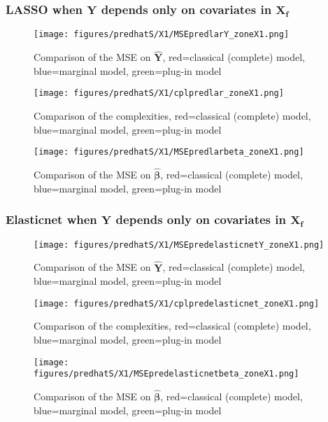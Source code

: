 \documentclass[12pt,a4paper]{report}
\begin{document}
\subsubsection{LASSO when $\boldsymbol{Y}$ depends only on covariates in $\boldsymbol{X_f}$}

	\begin{figure}[h!]
	\centering
		  \texttt{[image: figures/predhatS/X1/MSEpredlarY\_zoneX1.png]}
		\caption{Comparison of the MSE on $\hat{\boldsymbol{Y}}$, red=classical (complete) model, blue=marginal model, green=plug-in model}\label{MSEpredlarY_zoneX1}
	\end{figure}
	\begin{figure}[h!]
	\centering
		  \texttt{[image: figures/predhatS/X1/cplpredlar\_zoneX1.png]}
		\caption{Comparison of the complexities, red=classical (complete) model, blue=marginal model, green=plug-in model}\label{cplpredlar_zoneX1}
	\end{figure}
	\begin{figure}[h!]
	\centering
		  \texttt{[image: figures/predhatS/X1/MSEpredlarbeta\_zoneX1.png]}
		\caption{Comparison of the MSE on $\hat{\boldsymbol{\beta}}$, red=classical (complete) model, blue=marginal model, green=plug-in model}\label{MSEpredlarbeta_zoneX1}
	\end{figure}
	\FloatBarrier
\newpage
\subsubsection{Elasticnet when $\boldsymbol{Y}$ depends only on covariates in $\boldsymbol{X_f}$}

	\begin{figure}[h!]
	\centering
		  \texttt{[image: figures/predhatS/X1/MSEpredelasticnetY\_zoneX1.png]}
		\caption{Comparison of the MSE on $\hat{\boldsymbol{Y}}$, red=classical (complete) model, blue=marginal model, green=plug-in model}\label{MSEpredelasticnetY_zoneX1}
	\end{figure}
	\begin{figure}[h!]
	\centering
		  \texttt{[image: figures/predhatS/X1/cplpredelasticnet\_zoneX1.png]}
		\caption{Comparison of the complexities, red=classical (complete) model, blue=marginal model, green=plug-in model}\label{cplpredelasticnet_zoneX1}
	\end{figure}
	\begin{figure}[h!]
	\centering
		  \texttt{[image: figures/predhatS/X1/MSEpredelasticnetbeta\_zoneX1.png]}
		\caption{Comparison of the MSE on $\hat{\boldsymbol{\beta}}$, red=classical (complete) model, blue=marginal model, green=plug-in model}\label{MSEpredelasticnetbeta_zoneX1}
	\end{figure}
	\FloatBarrier
\newpage
\end{document}
